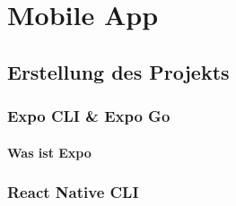 \part{Mobile App}
\label{mobileApp}

\chapter{Erstellung des Projekts}


\section{Expo CLI & Expo Go}
\subsection{Was ist Expo}


\section{React Native CLI}



